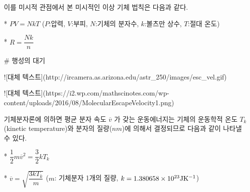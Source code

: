 이를 미시적 관점에서 본 미시적인 이상 기체 법칙은 다음과 같다.

*  $ PV = N k T $
($P$:압력, $V$:부피, $N$:기체의 분자수, $k$:볼츠만 상수, $T$:절대 온도)

*  $ R = \dfrac{Nk}{n} $



# 행성의 대기


![대체 텍스트](http://ircamera.as.arizona.edu/astr_250/images/esc_vel.gif)

![대체 텍스트](https://i2.wp.com/mathscinotes.com/wp-content/uploads/2016/08/MolecularEscapeVelocity1.png)

기체분자론에 의하면 평균 분자 속도 ${\overline{v}}$ 가 갖는 운동에너지는 기체의 운동학적 온도 $T_{k}$ (kinetic temperature)와 분자의 질량($nm$)에 의해서 결정되므로 다음과 같이 나타낼 수 있다.

*  $ \dfrac{1}{2} m {\overline{v}}^{2} = \dfrac{3}{2} k T_{k}$

*  $ \overline{v} = \sqrt {\dfrac{3kT_{k}}{m}} $
($m$: 기체분자 1개의 질량, $k = 1.380658 \times 10^{23}\rm{J K^{-1}}$) 









